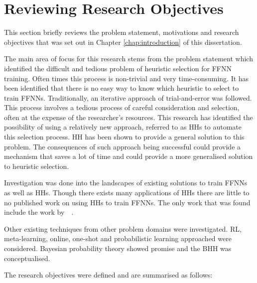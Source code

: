 \section{Reviewing Research Objectives}
\label{sec:conclusion:research_goals}

This section briefly reviews the problem statement, motivations and research objectives that was set out in Chapter \ref{chap:introduction} of this dissertation.

The main area of focus for this research stems from the problem statement which identified the difficult and tedious problem of heuristic selection for \ac{FFNN} training. Often times this process is non-trivial and very time-consuming. It has been identified that there is no easy way to know which heuristic to select to train \acp{FFNN}. Traditionally, an iterative approach of trial-and-error was followed. This process involves a tedious process of careful consideration and selection, often at the expense of the researcher's resources.  This research has identified the possibility of using a relatively new approach, referred to as \acp{HH} to automate this selection process. \ac{HH} has been shown to provide a general solution to this problem. The consequences of such approach being successful could provide a mechanism that saves a lot of time and could provide a more generalised solution to heuristic selection.

Investigation was done into the landscapes of existing solutions to train \acp{FFNN} as well as \acp{HH}. Though there exists many applications of \acp{HH} there are little to no published work on using \acp{HH} to train \acp{FFNN}. The only work that was found include the work by~\citeauthor{ref:nel:2021}~\cite{ref:nel:2021}.

Other existing techniques from other problem domains were investigated. \ac{RL}, meta-learning, online, one-shot and probabilistic learning approached were considered. Bayesian probability theory showed promise and the \Ac{BHH} was conceptualised.

The research objectives were defined and are summarised as follows:

